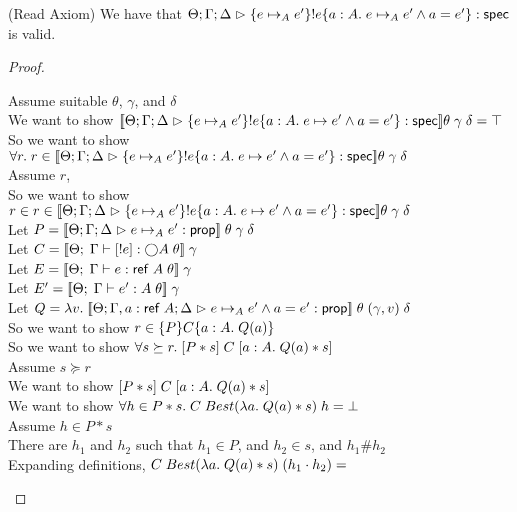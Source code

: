 \begin{lemma}{(Read Axiom)}
We have that $\judgeS{\spec{e \pointsto_A e'}{!e}{a:A}{e \pointsto_A e' \land a = e'}}$ is valid.\end{lemma}
\begin{proof}
  \begin{tabbedproof}
    \oo Assume suitable $\theta$, $\gamma$, and $\delta$ \\
    \ooo We want to show $\interp{\judgeS{\spec{e \pointsto_A e'}{!e}{a:A}{e \pointsto e' \land a = e'}}}\theta\;\gamma\;\delta = \top$ \\
    \ooo So we want to show $\forall r.\; r \in \interp{\judgeS{\spec{e \pointsto_A e'}{!e}{a:A}{e \pointsto e' \land a = e'}}}\theta\;\gamma\;\delta$ \\
    \ooo Assume $r$, \\
    \oooo So we want to show $r \in r \in \interp{\judgeS{\spec{e \pointsto_A e'}{!e}{a:A}{e \pointsto e' \land a = e'}}}\theta\;\gamma\;\delta$ \\
    \oooo Let $P = \interp{\judgeA{e \pointsto_A e'}{\assert}}\;\theta\;\gamma\;\delta$ \\
    \oooo Let $C = \interp{\judgeE{\Gamma}{\comp{!e}}{\monad{A}}\;\theta}\;\gamma$ \\
    \oooo Let $E = \interp{\judgeE{\Gamma}{e}{\reftype{A}}\;\theta}\;\gamma$ \\
    \oooo Let $E' = \interp{\judgeE{\Gamma}{e'}{A}\;\theta}\;\gamma$ \\
    \oooo Let $Q = \semfun{v}{\interp{\judgeA[\Theta; \Gamma, a:\reftype{A}; \Delta]{e \pointsto_A e' \land a = e'}{\assert}}\;\theta\;(\gamma, v)\;\delta}$ \\
    \oooo So we want to show $r \in \spec{P}{C}{a:A}{Q(a)}$ \\
    \oooo So we want to show $\forall s \succeq r.\; \basicspec{P*s}{C}{a:A}{Q(a)*s}$ \\
    \oooo Assume $s \succeq r$ \\
    \ooooo We want to show $\basicspec{P*s}{C}{a:A}{Q(a)*s}$ \\
    \ooooo We want to show $\forall h \in P*s.\; C\;Best(\semfun{a}{Q(a)*s})\;h = \bot$ \\
    \ooooo Assume $h \in P*s$ \\
    \oooooo There are $h_1$ and $h_2$ such that $h_1 \in P$, and $h_2 \in s$, and $h_1 \# h_2$ \\
    \oooooo Expanding definitions, $C\;Best(\semfun{a}{Q(a)*s})\;(h_1 \cdot h_2) = $ \\

\end{tabbedproof}
\end{proof}
